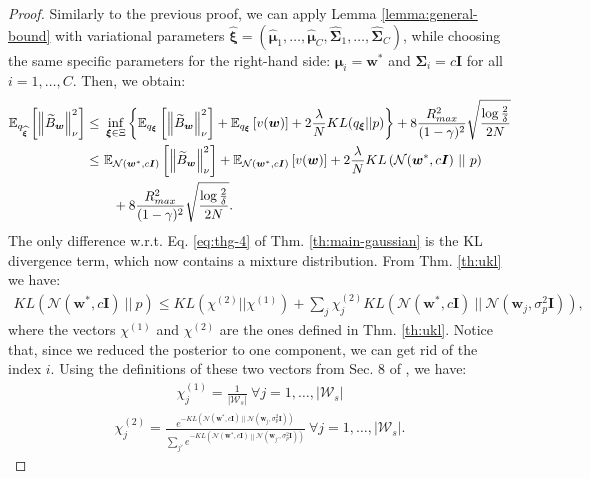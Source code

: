 \documentclass{article}
\newcommand{\wt}[1]{\widetilde{#1}}
\newcommand{\wh}[1]{\widehat{#1}}
\newcommand{\norm}[1]{\left\lVert #1 \right\rVert}
\newcommand{\abs}[1]{\left\lvert #1 \right\rvert}
\begin{document}
\begin{proof}
Similarly to the previous proof, we can apply Lemma \ref{lemma:general-bound} with variational parameters $\wh{\bm{\xi}} = (\wh{\bm{\mu}}_1,\dots,\wh{\bm{\mu}}_C,\wh{\bm{\Sigma}}_1,\dots,\wh{\bm{\Sigma}}_C)$, while choosing the same specific parameters for the right-hand side: $\bm{\mu}_i = \bm{w}^*$ and $\bm{\Sigma}_i = c\bm{I}$ for all $i=1,\dots,C$. Then, we obtain:
\begin{align}\label{eq:thmg-1}
\mathbb{E}_{q_{\wh{\bm{\xi}}}}\left[ \norm{\wt B_{\bm{w}}}_{\nu}^2 \right ] \leq\ & \inf_{\bm{\xi} \in \Xi}\left\{ \mathbb{E}_{q_{\bm{\xi}}}\left[ \norm{\wt B_{\bm{w}}}_{\nu}^2 \right ] + \mathbb{E}_{q_{\bm{\xi}}}\left[ v(\bm{w}) \right] + 2\frac{\lambda}{N} KL({q_{\bm{\xi}}}||p) \right\} + 8\frac{R_{max}^2}{(1-\gamma)^2}\sqrt{\frac{\log\frac{2}{\delta}}{2N}}\notag\\ \leq\ & \mathbb{E}_{\mathcal{N}(\bm{w}^*,c\bm{I})}\left[ \norm{\wt B_{\bm{w}}}_{\nu}^2 \right ] + \mathbb{E}_{\mathcal{N}(\bm{w}^*,c\bm{I})}\left[ v(\bm{w}) \right] + 2\frac{\lambda}{N} KL\left(\mathcal{N}(\bm{w}^*,c\bm{I})\ ||\ p\right)\notag\\ &\ \ + 8\frac{R_{max}^2}{(1-\gamma)^2}\sqrt{\frac{\log\frac{2}{\delta}}{2N}}.
\end{align}
The only difference w.r.t. Eq. \eqref{eq:thg-4} of Thm. \ref{th:main-gaussian} is the KL divergence term, which now contains a mixture distribution. From Thm. \ref{th:ukl} we have:
\begin{align}\label{eq:thmg-2}
KL(\mathcal{N}(\bm{w}^*,c\bm{I})\ ||\ p) \leq KL(\chi^{(2)}||\chi^{(1)}) + \sum_{j} \chi^{(2)}_{j}KL(\mathcal{N}(\bm{w}^*,c\bm{I})\ ||\ \mathcal{N}(\bm{w}_j, \sigma_p^2\bm{I})),
\end{align}
where the vectors $\chi^{(1)}$ and $\chi^{(2)}$ are the ones defined in Thm. \ref{th:ukl}. Notice that, since we reduced the posterior to one component, we can get rid of the index $i$. Using the definitions of these two vectors from Sec. 8 of \cite{hershey2007approximating}, we have:
\begin{align*}
\chi^{(1)}_j = \frac{1}{\abs{\mathcal{W}_s}}\ \forall j = 1,\dots,\abs{\mathcal{W}_s}
\end{align*}
\begin{align}\label{eq:chi2}
\chi^{(2)}_j = \frac{e^{-KL(\mathcal{N}(\bm{w}^*,c\bm{I})\ ||\ \mathcal{N}(\bm{w}_j, \sigma_p^2\bm{I}))}}{\sum_{j'}e^{-KL(\mathcal{N}(\bm{w}^*,c\bm{I})\ ||\ \mathcal{N}(\bm{w}_{j'}, \sigma_p^2\bm{I}))}}\ \forall j = 1,\dots,\abs{\mathcal{W}_s}.
\end{align}

\end{proof}
\end{document}
